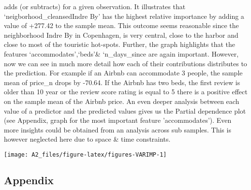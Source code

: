 \documentclass[
]{article}
\begin{document}
adds (or subtracts) for a given observation. It illustrates that
`neigborhood\_cleansedIndre By' has the highest relative importance by
adding a value of +277.42 to the sample mean. This outcome seems
reasonable since the neighborhood Indre By in Copenhagen, is very
central, close to the harbor and close to most of the touristic
hot-spots. Further, the graph highlights that the features
`accommodates',`beds'\& `n\_days\_since are again important. However,
now we can see in much more detail how each of their contributions
distributes to the prediction. For example if an Airbnb can accommodate
3 people, the sample mean of price\_n drops by -70.64. If the Airbnb has
two beds, the first review is older than 10 year or the review score
rating is equal to 5 there is a positive effect on the sample mean of
the Airbnb price. An even deeper analysis between each value of a
predictor and the predicted values gives us the Partial dependence plot
(see Appendix, graph for the most important feature 'accommodates').
Even more insights could be obtained from an analysis across sub
samples. This is however neglected here due to space \& time
constraints.

\texttt{[image: A2\_files/figure-latex/figures-VARIMP-1]}

\hypertarget{appendix}{%
\subsection{Appendix}\label{appendix}}
\end{document}
